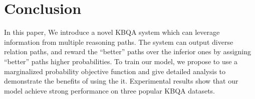 \section{Conclusion}

In this paper, We introduce a novel KBQA system which can leverage information from multiple reasoning paths. The system can output diverse relation paths, and reward the ``better'' paths over the inferior ones by assigning ``better'' paths higher probabilities. To train our model, we propose to use a marginalized probability objective function and give detailed analysis to demonstrate the benefits of using the it. Experimental results show that our model achieve strong performance on three popular KBQA datasets.